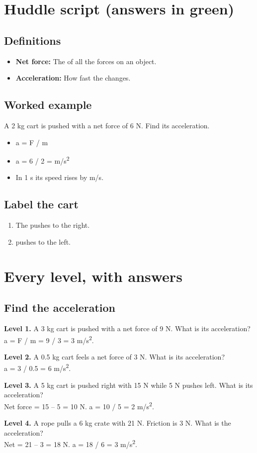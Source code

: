 \documentclass[11pt]{article}
\begin{document}
\section*{Huddle script (answers in green)}
\subsection*{Definitions}\begin{itemize}
\item \textbf{Net force:} The  of all the forces on an object.
\item \textbf{Acceleration:} How fast the  changes.
\end{itemize}
\subsection*{Worked example}
A 2 kg cart is pushed with a net force of 6 N. Find its acceleration.\\
\begin{itemize}
\item a = F / m
\item a = 6 / 2 =  m/s\textsuperscript{2}
\item In 1 s its speed rises by  m/s.
\end{itemize}
\subsection*{Label the cart}
\begin{enumerate}
\item The  pushes to the right.
\item {} pushes to the left.
\end{enumerate}
\section*{Every level, with answers}
\subsection*{Find the acceleration}
\noindent\textbf{Level 1.} A 3 kg cart is pushed with a net force of 9 N. What is its acceleration?\\  \quad a = F / m = 9 / 3 = 3 m/s\textsuperscript{2}.\par\medskip
\noindent\textbf{Level 2.} A 0.5 kg cart feels a net force of 3 N. What is its acceleration?\\  \quad a = 3 / 0.5 = 6 m/s\textsuperscript{2}.\par\medskip
\noindent\textbf{Level 3.} A 5 kg cart is pushed right with 15 N while 5 N pushes left. What is its acceleration?\\  \quad Net force = 15 -- 5 = 10 N. a = 10 / 5 = 2 m/s\textsuperscript{2}.\par\medskip
\noindent\textbf{Level 4.} A rope pulls a 6 kg crate with 21 N. Friction is 3 N. What is the acceleration?\\  \quad Net = 21 -- 3 = 18 N. a = 18 / 6 = 3 m/s\textsuperscript{2}.\par\medskip
\end{document}
